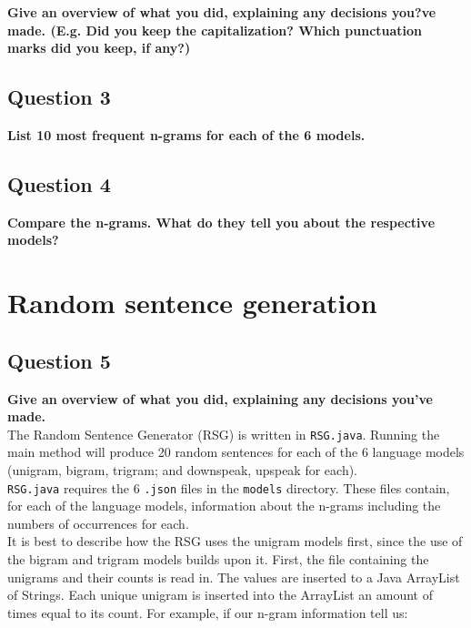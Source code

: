 \documentclass{article} %
\begin{document}
\textbf{Give an overview of what you did, explaining any decisions you?ve made. (E.g. Did you keep the capitalization? Which punctuation marks did you keep, if any?)}
\\


\lipsum[2] %

\subsection*{Question 3}

\textbf{List 10 most frequent n-grams for each of the 6 models.}
\\


\lipsum[2] %

\subsection*{Question 4}

\textbf{Compare the n-grams. What do they tell you about the respective
models?}
\\


\lipsum[2] %

\section{Random sentence generation}
\subsection*{Question 5}

\textbf{Give an overview of what you did, explaining any decisions you've made.}
\\

The Random Sentence Generator (RSG) is written in \texttt{RSG.java}. Running the main method will produce 20 random sentences for each of the 6 language models (unigram, bigram, trigram; and downspeak, upspeak for each).\\

\texttt{RSG.java} requires the 6 \texttt{.json} files in the \texttt{models} directory. These files contain, for each of the language models, information about the n-grams including the numbers of occurrences for each.\\

It is best to describe how the RSG uses the unigram models first, since the use of the bigram and trigram models builds upon it. First, the file containing the unigrams and their counts is read in. The values are inserted to a Java ArrayList of Strings. Each unique unigram is inserted into the ArrayList an amount of times equal to its count. For example, if our n-gram information tell us:\\
\end{document}

